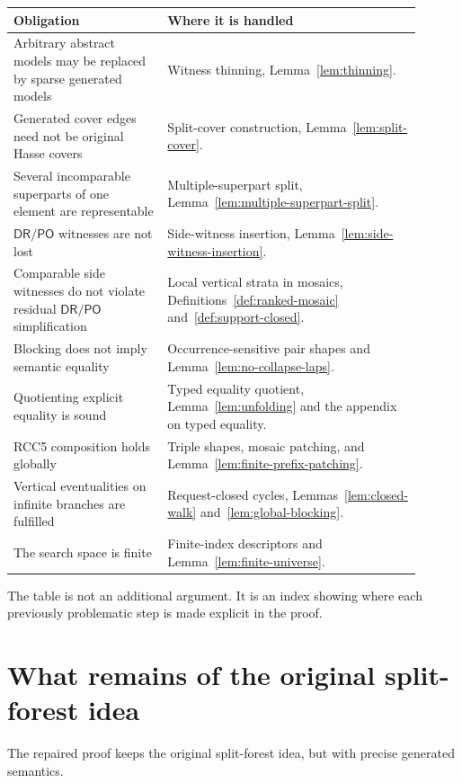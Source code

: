 \documentclass[11pt]{article}
\newcommand{\DR}{\mathsf{DR}}
\newcommand{\PO}{\mathsf{PO}}
\begin{document}
\begin{center}
\begin{tabular}{p{0.34\linewidth}p{0.56\linewidth}}
\toprule
Obligation & Where it is handled \\
\midrule
Arbitrary abstract models may be replaced by sparse generated models & Witness thinning, Lemma~\ref{lem:thinning}. \\
Generated cover edges need not be original Hasse covers & Split-cover construction, Lemma~\ref{lem:split-cover}. \\
Several incomparable superparts of one element are representable & Multiple-superpart split, Lemma~\ref{lem:multiple-superpart-split}. \\
$\DR/\PO$ witnesses are not lost & Side-witness insertion, Lemma~\ref{lem:side-witness-insertion}. \\
Comparable side witnesses do not violate residual $\DR/\PO$ simplification & Local vertical strata in mosaics, Definitions~\ref{def:ranked-mosaic} and~\ref{def:support-closed}. \\
Blocking does not imply semantic equality & Occurrence-sensitive pair shapes and Lemma~\ref{lem:no-collapse-laps}. \\
Quotienting explicit equality is sound & Typed equality quotient, Lemma~\ref{lem:unfolding} and the appendix on typed equality. \\
RCC5 composition holds globally & Triple shapes, mosaic patching, and Lemma~\ref{lem:finite-prefix-patching}. \\
Vertical eventualities on infinite branches are fulfilled & Request-closed cycles, Lemmas~\ref{lem:closed-walk} and~\ref{lem:global-blocking}. \\
The search space is finite & Finite-index descriptors and Lemma~\ref{lem:finite-universe}. \\
\bottomrule
\end{tabular}
\end{center}

The table is not an additional argument.  It is an index showing where each previously problematic step is made explicit in the proof.


\section{What remains of the original split-forest idea}

The repaired proof keeps the original split-forest idea, but with precise generated semantics.
\end{document}
